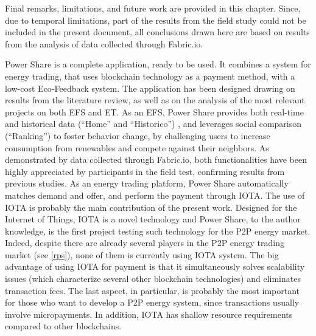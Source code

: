 \cleardoublepage
\label{chap:conclusions}

Final remarks, limitations, and future work are provided in this chapter. Since, due to temporal limitations, part of the results from the field study could not be included in the present document, all conclusions drawn here are based on results from the analysis of data collected through Fabric.io. 
	
	
	
Power Share is a complete application, ready to be used. It combines a system for energy trading, that uses blockchain technology as a payment method, with a low-cost Eco-Feedback system. The application has been designed drawing on results from the literature review, as well as on the analysis of the most relevant projects on both \ac{EFS} and \ac{ET}.
As an \ac{EFS}, Power Share provides both real-time and historical data (“Home” and “Historico”) \cite{Giulio2009}, and leverages social comparison (“Ranking”) \cite{Froehlich2010} to foster behavior change, by challenging users to increase consumption from renewables and compete against their neighbors. As demonstrated by data collected through Fabric.io, both functionalities have been highly appreciated by participants in the field test, confirming results from previous studies.
As an energy trading platform, Power Share automatically matches demand and offer, and perform the payment through IOTA. The use of IOTA is probably the main contribution of the present work. Designed for the Internet of Things, IOTA is a novel technology and Power Share, to the author knowledge, is the first project testing such technology for the P2P energy market. Indeed, despite there are already several players in the P2P energy trading market (see \cref{rps}), none of them is currently using IOTA system. The big advantage of using IOTA for payment is that it simultaneously solves scalability issues (which characterize several other blockchain technologies) and eliminates transaction fees. The last aspect, in particular, is probably the most important for those who want to develop a P2P energy system, since transactions usually involve micropayments. In addition, IOTA has shallow resource requirements compared to other blockchains. 



